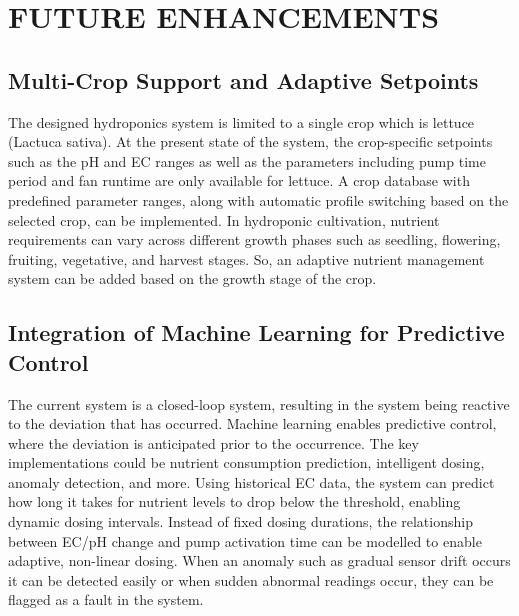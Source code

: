 \chapter{FUTURE ENHANCEMENTS}

\section{Multi-Crop Support and Adaptive Setpoints}
The designed hydroponics system is limited to a single crop which is lettuce (Lactuca sativa). At the present state of the system, the crop-specific setpoints such as the pH and EC ranges as well as the parameters including pump time period and fan runtime are only available for lettuce. A crop database with predefined parameter ranges, along with automatic profile switching based on the selected crop, can be implemented. In hydroponic cultivation, nutrient requirements can vary across different growth phases such as seedling, flowering, fruiting, vegetative, and harvest stages. So, an adaptive nutrient management system can be added based on the growth stage of the crop. 

\section{Integration of Machine Learning for Predictive Control}
The current system is a closed-loop system, resulting in the system being reactive to the deviation that has occurred. Machine learning enables predictive control, where the deviation is anticipated prior to the occurrence.  The key implementations could be nutrient consumption prediction, intelligent dosing, anomaly detection, and more. Using historical EC data, the system can predict how long it takes for nutrient levels to drop below the threshold, enabling dynamic dosing intervals. Instead of fixed dosing durations, the relationship between EC/pH change and pump activation time can be modelled to enable adaptive, non-linear dosing. When an anomaly such as gradual sensor drift occurs it can be detected easily or when sudden abnormal readings occur, they can be flagged as a fault in the system. 


